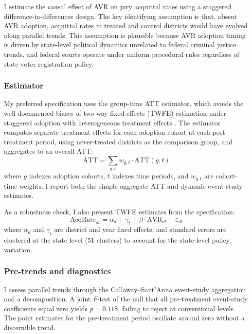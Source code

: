 \documentclass[12pt]{article}
\begin{document}
I estimate the causal effect of AVR on jury acquittal rates using a staggered difference-in-differences design. The key identifying assumption is that, absent AVR adoption, acquittal rates in treated and control districts would have evolved along parallel trends. This assumption is plausible because AVR adoption timing is driven by state-level political dynamics unrelated to federal criminal justice trends, and federal courts operate under uniform procedural rules regardless of state voter registration policy.

\subsubsection*{Estimator} My preferred specification uses the \citet{callaway2021difference} group-time ATT estimator, which avoids the well-documented biases of two-way fixed effects (TWFE) estimation under staggered adoption with heterogeneous treatment effects \citep{goodmanbacon2021difference, roth2023whats}. The estimator computes separate treatment effects for each adoption cohort at each post-treatment period, using never-treated districts as the comparison group, and aggregates to an overall ATT:
\begin{equation}
\text{ATT} = \sum_{g,t} w_{g,t} \cdot \text{ATT}(g,t)
\end{equation}
where $g$ indexes adoption cohorts, $t$ indexes time periods, and $w_{g,t}$ are cohort-time weights. I report both the simple aggregate ATT and dynamic event-study estimates.

As a robustness check, I also present TWFE estimates from the specification:
\begin{equation}
\text{AcqRate}_{dt} = \alpha_d + \gamma_t + \beta \cdot \text{AVR}_{dt} + \varepsilon_{dt}
\end{equation}
where $\alpha_d$ and $\gamma_t$ are district and year fixed effects, and standard errors are clustered at the state level (51 clusters) to account for the state-level policy variation.

\subsubsection*{Pre-trends and diagnostics} I assess parallel trends through the Callaway--Sant'Anna event-study aggregation and a \citet{sun2021estimating} decomposition. A joint $F$-test of the null that all pre-treatment event-study coefficients equal zero yields $p = 0.118$, failing to reject at conventional levels. The point estimates for the pre-treatment period oscillate around zero without a discernible trend.
\end{document}
